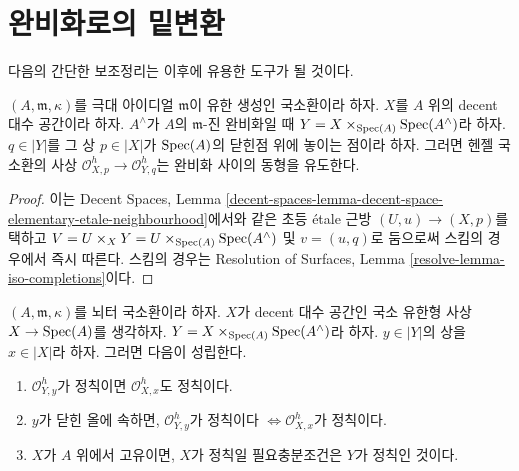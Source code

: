 \section{완비화로의 밑변환}
\label{section-aux}

\noindent
다음의 간단한 보조정리는 이후에 유용한 도구가 될 것이다.

\begin{lemma}
\label{lemma-iso-completions}
$(A, \mathfrak m, \kappa)$를 극대 아이디얼 $\mathfrak m$이
유한 생성인 국소환이라 하자. $X$를 $A$ 위의 decent 대수 공간이라 하자.
$A^\wedge$가 $A$의 $\mathfrak m$-진 완비화일 때
$Y = X \times_{\mathop{\mathrm{Spec}}(A)} \mathop{\mathrm{Spec}}(A^\wedge)$라 하자.
$q \in |Y|$를 그 상 $p \in |X|$가 $\mathop{\mathrm{Spec}}(A)$의 닫힌점 위에 놓이는
점이라 하자. 그러면 헨젤 국소환의 사상
$\mathcal{O}_{X, p}^h \to \mathcal{O}_{Y, q}^h$는
완비화 사이의 동형을 유도한다.
\end{lemma}

\begin{proof}
이는 Decent Spaces, Lemma
\ref{decent-spaces-lemma-decent-space-elementary-etale-neighbourhood}에서와 같은
초등 \'etale 근방 $(U, u) \to (X, p)$를 택하고
$V = U \times_X Y = U \times_{\mathop{\mathrm{Spec}}(A)} \mathop{\mathrm{Spec}}(A^\wedge)$ 및
$v = (u, q)$로 둠으로써 스킴의 경우에서 즉시 따른다.
스킴의 경우는 Resolution of Surfaces, Lemma
\ref{resolve-lemma-iso-completions}이다.
\end{proof}

\begin{lemma}
\label{lemma-port-regularity-to-completion}
$(A, \mathfrak m, \kappa)$를 뇌터 국소환이라 하자.
$X$가 decent 대수 공간인 국소 유한형 사상
$X \to \mathop{\mathrm{Spec}}(A)$를 생각하자.
$Y = X \times_{\mathop{\mathrm{Spec}}(A)} \mathop{\mathrm{Spec}}(A^\wedge)$라 하자.
$y \in |Y|$의 상을 $x \in |X|$라 하자. 그러면 다음이 성립한다.
\begin{enumerate}
\item $\mathcal{O}_{Y, y}^h$가 정칙이면
$\mathcal{O}_{X, x}^h$도 정칙이다.
\item $y$가 닫힌 올에 속하면, $\mathcal{O}_{Y, y}^h$가 정칙이다
$\Leftrightarrow \mathcal{O}_{X, x}^h$가 정칙이다.
\item $X$가 $A$ 위에서 고유이면, $X$가 정칙일 필요충분조건은
$Y$가 정칙인 것이다.
\end{enumerate}
\end{lemma}

